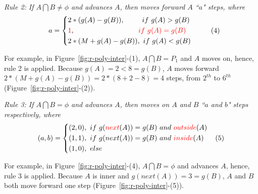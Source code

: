 \sstab \emph{Rule 2:
If $A \bigcap B \ne \phi$ and advances $A$, then moves forward $A$ ``$a$" steps, where}
\vspace{-1ex}
\begin{equation*}
\label{equ-rule2}
\small
    \hspace{2ex} a =  \left\{
    \begin{aligned}
        & 2*(g(A) - g(B)),  \hspace{5ex} ~if  ~g(A) > g(B) \\
        & \textcolor[rgb]{1.00,0.00,0.00}{1}, \hspace{21ex}\textcolor[rgb]{1.00,0.00,0.00}{if  ~g(A) = g(B)} \\
        & 2*(M+g(A) - g(B)), ~if  ~g(A) < g(B) \\
    \end{aligned}
    \right.       \hspace{6ex}(4)
\end{equation*}
\vspace{-1ex}


For example, in Figure~\ref{fig:r-poly-inter}-(1), $A \bigcap B = P_1$ and $A$ moves on, hence, rule 2 is applied. Because $g(A)=2 < 8=g(B)$, $A$ moves forward $2*(M+g(A) - g(B)) = 2*(8+2-8)= 4$ steps, \ie from $2^{th}$ to $6^{th}$ (Figure~\ref{fig:r-poly-inter}-(2)).



\sstab \emph{Rule 3:
If $A \bigcap B = \phi$ and advances $A$, then moves on $A$ and $B$ ``$a$ and $b$" steps respectively, where}
\vspace{-1ex}
\begin{equation*}
\label{equ-rule3}
\small
    \hspace{0ex} (a,b) =  \left\{
    \begin{aligned}
        & (2,0), ~if~ g(\textcolor[rgb]{1.00,0.00,0.00}{next}(A)) = g(B) ~and~ \textcolor[rgb]{1.00,0.00,0.00}{outside}(A)  \\
        & (1,1), ~if~ g(next(A)) = g(B) ~and~ \textcolor[rgb]{1.00,0.00,0.00}{inside}(A)\\
        & (1,0), ~else
    \end{aligned}
    \right.       \hspace{2ex}(5)
\end{equation*}
\vspace{-1ex}

For example, in Figure~\ref{fig:r-poly-inter}-(4), $A \bigcap B = \phi$ and advances $A$, hence, rule 3 is applied. Because $A$ is inner and $g(next(A))=3 = g(B)$, $A$ and $B$ both move forward one step (Figure~\ref{fig:r-poly-inter}-(5)).



